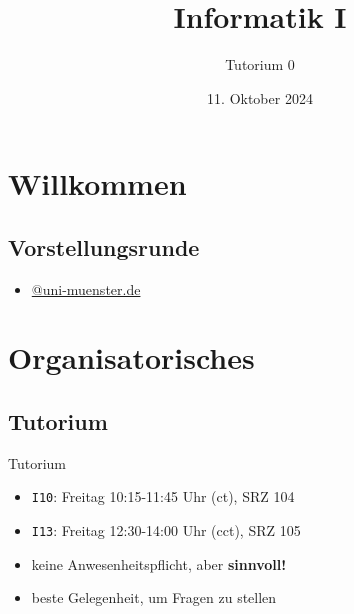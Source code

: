\documentclass[aspectratio=169,usepdftitle=true,t]{beamer}
\title{Informatik I}
\subtitle{Tutorium 0}
\institute{Universität Münster}
\date{11. Oktober 2024}
\author{\lqfullname}
\begin{document}
\section{Willkommen}
\subsection{Vorstellungsrunde}

\begin{frame}{}
    \begin{block}{\lqfirstname}
    \begin{itemize}
        \item \href{mailto:{\lqemail}@uni-muenster.de}{{\lqemail}@uni-muenster.de}
    \end{itemize}
    \end{block}
\end{frame}

\section{Organisatorisches}
\subsection{Tutorium}

\begin{frame}{Tutorium}
    \begin{itemize}
        \item<1-> \texttt{I10}: Freitag 10:15-11:45 Uhr (ct), SRZ 104
        \item<1-> \texttt{I13}: Freitag 12:30-14:00 Uhr (cct), SRZ 105
    \end{itemize}
    \vspace{\fill}
    \begin{itemize}
        \item<2-> keine Anwesenheitspflicht, aber \textbf{sinnvoll!}
        \item<2-> beste Gelegenheit, um Fragen zu stellen
    \end{itemize}
\end{frame}
\end{document}
